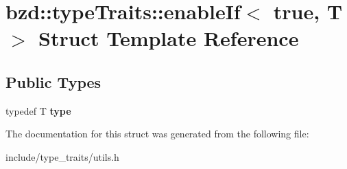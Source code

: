 \hypertarget{structbzd_1_1typeTraits_1_1enableIf_3_01true_00_01T_01_4}{}\section{bzd\+:\+:type\+Traits\+:\+:enable\+If$<$ true, T $>$ Struct Template Reference}
\label{structbzd_1_1typeTraits_1_1enableIf_3_01true_00_01T_01_4}
\subsection*{Public Types}
\begin{DoxyCompactItemize}
\item 
\mbox{\label{structbzd_1_1typeTraits_1_1enableIf_3_01true_00_01T_01_4_aa30b8463903d5853141fea5ebf7f484e}} 
typedef T {\bfseries type}
\end{DoxyCompactItemize}


The documentation for this struct was generated from the following file\+:\begin{DoxyCompactItemize}
\item 
include/type\+\_\+traits/utils.\+h\end{DoxyCompactItemize}
